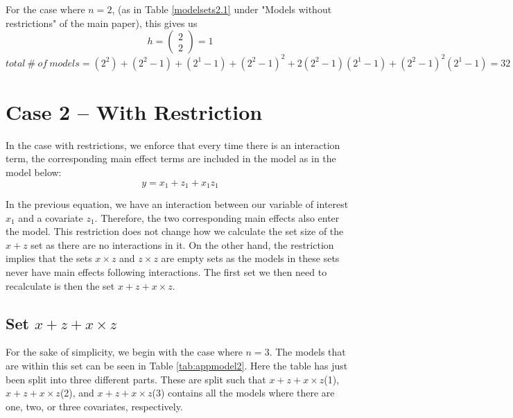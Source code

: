 For the case where $n=2$, (as in Table \ref{modelsets2.1} under "Models without restrictions" of the main paper), this gives us
\[h=\left( \begin{array}{c}
2 \\ 
2 \end{array}
\right)=1\] 
$total \ \#\ of\ models=\left(2^2\right)+\left(2^2-1\right)+\left(2^1-1\right)+{\left(2^2-1\right)}^2+2\left(2^2-1\right)\left(2^1-1\right)+{\left(2^2-1\right)}^2\left(2^1-1\right)=32$ 

\section{Case 2 – With Restriction}

In the case with restrictions, we enforce that every time there is an interaction term, the corresponding main effect terms are included in the model as in the model below:
\[y=x_1+z_1+x_1z_1\] 

In the previous equation, we have an interaction between our variable of interest $x_1$ and a covariate $z_1$. Therefore, the two corresponding main effects also enter the model. This restriction does not change how we calculate the set size of the $x + z$ set as there are no interactions in it. On the other hand,  the restriction implies that the sets $x \times z$ and $z \times z$ are empty sets as the models in these sets never have main effects following interactions. The first set we then need to recalculate is then the set $x + z + x \times z$.

\subsection{Set $x + z + x \times z$}
For the sake of simplicity, we begin with the case where $n=3$. The models that are within this set can be seen in Table \ref{tab:appmodel2}. Here the table has just been split into three different parts. These are split such that $x + z + x \times z$(1), $x + z + x \times z$(2), and $x + z + x \times z$(3) contains all the models where there are one, two, or three covariates, respectively.\\

